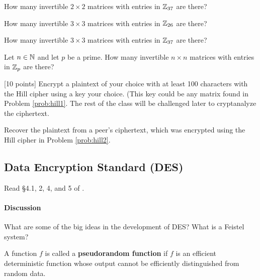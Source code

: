 \begin{problem}  [10 points]
How many invertible $2\times 2$ matrices with entries in $\mathbb{Z}_{37}$ are there?
\end{problem}

\begin{problem}  [10 points]
How many invertible $3\times 3$ matrices with entries in $\mathbb{Z}_{26}$ are there?
\end{problem}

\begin{problem}  [10 points]
How many invertible $3\times 3$ matrices with entries in $\mathbb{Z}_{37}$ are there?
\end{problem}

\begin{problem}  [15 points]
Let $n\in\mathbb{N}$ and let $p$ be a prime. How many invertible $n\times n$ matrices with entries in $\mathbb{Z}_p$ are there?
\end{problem}

\begin{problem}
\label{prob:hill2}  [10 points]
Encrypt a plaintext of your choice with at least 100 characters with the Hill cipher using a key your choice. (This key could be any matrix found in Problem \ref{prob:hill1}. The rest of the class will be challenged later to cryptanalyze the ciphertext.
\end{problem}
\begin{problem}  
Recover the plaintext from a peer's ciphertext, which was encrypted using the Hill cipher in Problem \ref{prob:hill2}.
\end{problem}


		\subsection{Data Encryption Standard (DES)} 

		Read \S 4.1, 2, 4, and 5 of \cite{tw}.

\paragraph*{Discussion} What are some of the big ideas in the development of DES? What is a Feistel system?

\begin{definition}
	A function $f$ is called a {\bf pseudorandom function}  if $f$ is an efficient deterministic function whose output cannot be efficiently distinguished from random data.
\end{definition}


